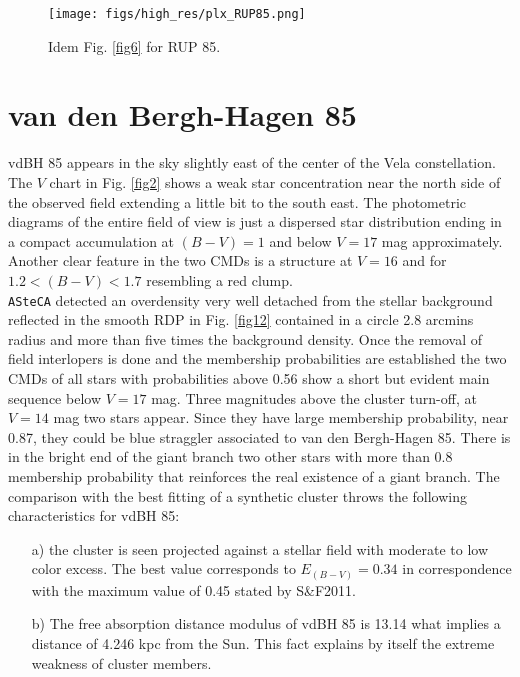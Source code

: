 \documentclass{aa}
\begin{document}
\begin{figure*}[ht]
    \centering
    \texttt{[image: figs/high\_res/plx\_RUP85.png]}
    \caption{Idem Fig. \ref{fig6} for RUP 85.}
    \label{fig10}
\end{figure*}



\section{van den Bergh-Hagen 85}

vdBH 85 appears in the sky slightly east of the center of the
Vela constellation. The $V$ chart in Fig. \ref{fig2} shows a weak star
concentration near the north side of the observed field extending a little bit
to the south east. The photometric diagrams of the entire field of view is just
a dispersed star distribution ending in a compact accumulation at $(B-V)=1$ and
below $V = 17$ mag approximately. Another clear feature in the two CMDs is a
structure at $V = 16$ and for $1.2 < (B-V) < 1.7$ resembling a red clump.\\

\texttt{ASteCA} detected an overdensity very well detached from the stellar
background reflected in the smooth RDP in Fig. \ref{fig12} contained in a circle
2.8 arcmins radius and more than five times the background density. Once the
removal of field interlopers is done and the membership probabilities are
established the two CMDs of all stars with probabilities above 0.56 show a short
but evident main sequence below $V = 17$ mag. Three magnitudes above the cluster
turn-off, at $V = 14$ mag two stars appear. Since they have large membership
probability, near 0.87, they could be blue straggler associated to van den
Bergh-Hagen 85. There is in the bright end of the giant branch two other stars
with more than 0.8 membership probability that reinforces the real existence of
a giant branch. The comparison with the best fitting of a synthetic cluster
throws the following characteristics for vdBH 85:

\begin{itemize}
\item [a)] the cluster is seen projected against a stellar field with moderate to
    low color excess. The best value corresponds to $E_{(B-V)} = 0.34$ in
    correspondence with the maximum value of 0.45 stated by S\&F2011.
\item [b)] The free absorption distance modulus of vdBH 85 is
    13.14 what implies a distance of 4.246 kpc from the Sun. This fact explains
    by itself the extreme weakness of cluster members.
\end{itemize}
\end{document}
